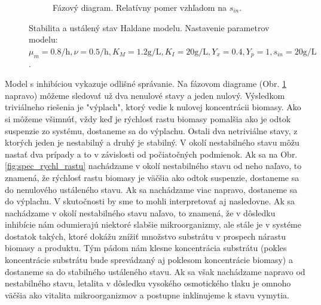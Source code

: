 \begin{figure}
\begin{subfigure}[b]{0.49\textwidth}
		\caption{Fázový diagram. Relatívny pomer vzhľadom na $ s_{in} $.}
		\label{fig:fazovy_haldane}
	\end{subfigure}
	\caption{Stabilita a ustálený stav Haldane modelu. Nastavenie parametrov modelu: $ \mu_{m} = 0.8\si{\per\hour}, \nu = 0.5\si{\per\hour}, K_{M} = 1.2\si{\gram\per\liter}, K_{I} = 20\si{\gram\per\liter}, Y_{x} = 0.4, Y_{p} = 1, s_{in} = 20\si{\gram\per\liter}$.}
	\label{fig:stabilita_haldane}
\end{figure}

Model s inhibíciou vykazuje odlišné správanie. Na fázovom diagrame (Obr. \ref{fig:fazovy_haldane} napravo) môžeme sledovať už dva nenulové stavy a jeden nulový. Výsledkom triviálneho riešenia je "výplach", ktorý vedie k nulovej koncentrácii biomasy. Ako si môžeme všimnúť, vždy keď je rýchlosť rastu biomasy pomalšia ako je odtok suspenzie zo systému, dostaneme sa do výplachu. Ostali dva netriviálne stavy, z ktorých jeden je nestabilný a druhý je stabilný. V okolí nestabilného stavu môžu nastať dva prípady a to v závislosti od počiatočných podmienok. Ak sa na Obr. \ref{fig:spec_rychl_rastu} nachádzame v okolí nestabilného stavu od neho naľavo, to znamená, že rýchlosť rastu biomasy je väčšia ako odtok suspenzie, dostaneme sa do nenulového ustáleného stavu. Ak sa nachádzame viac napravo, dostaneme sa do výplachu. V skutočnosti by sme to mohli interpretovať aj nasledovne. Ak sa nachádzame v okolí nestabilného stavu naľavo, to znamená, že v dôsledku inhibície nám odumierajú niektoré slabšie mikroorganizmy, ale stále je v systéme dostatok takých, ktoré dokážu znížiť množstvo substrátu v prospech nárastu biomasy a produktu. Tým pádom nám klesne koncentrácia substrátu (pokles koncentrácie substrátu bude sprevádzaný aj poklesom koncentrácie biomasy) a dostaneme sa do stabilného ustáleného stavu. Ak sa však nachádzame napravo od nestabilného stavu, letalita v dôsledku vysokého osmotického tlaku je omnoho väčšia ako vitalita mikroorganizmov a postupne inklinujeme k stavu vymytia.